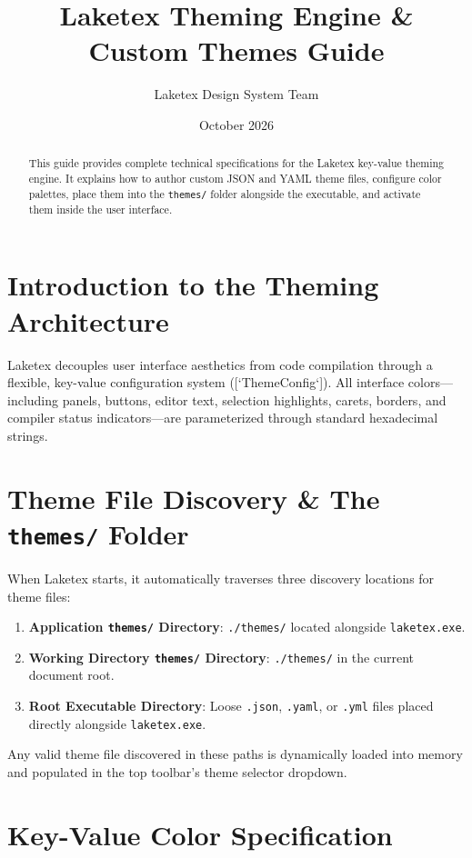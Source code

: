 \documentclass[11pt, a4paper]{article}
\title{\textbf{Laketex Theming Engine \& Custom Themes Guide}}
\author{Laketex Design System Team}
\date{October 2026}
\begin{document}
\maketitle

\begin{abstract}
This guide provides complete technical specifications for the Laketex key-value theming engine. It explains how to author custom JSON and YAML theme files, configure color palettes, place them into the \texttt{themes/} folder alongside the executable, and activate them inside the user interface.
\end{abstract}

\section{Introduction to the Theming Architecture}

Laketex decouples user interface aesthetics from code compilation through a flexible, key-value configuration system ([`ThemeConfig`]). All interface colors—including panels, buttons, editor text, selection highlights, carets, borders, and compiler status indicators—are parameterized through standard hexadecimal strings.

\section{Theme File Discovery \& The \texttt{themes/} Folder}

When Laketex starts, it automatically traverses three discovery locations for theme files:
\begin{enumerate}
    \item \textbf{Application \texttt{themes/} Directory}: \texttt{./themes/} located alongside \texttt{laketex.exe}.
    \item \textbf{Working Directory \texttt{themes/} Directory}: \texttt{./themes/} in the current document root.
    \item \textbf{Root Executable Directory}: Loose \texttt{.json}, \texttt{.yaml}, or \texttt{.yml} files placed directly alongside \texttt{laketex.exe}.
\end{enumerate}

Any valid theme file discovered in these paths is dynamically loaded into memory and populated in the top toolbar's theme selector dropdown.

\section{Key-Value Color Specification}
\end{document}
